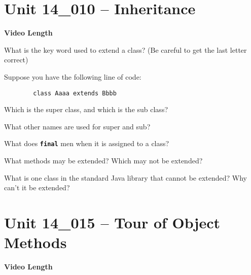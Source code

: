 \documentclass[letterpaper,12pt]{exam}
\newcommand{\unit}{Unit 14}
\begin{document}
\section*{\unit\_010 -- Inheritance} 
\par{\selectfont\textbf{Video Length }}
\begin{questions}

\begin{samepage}
    \question What is the key word used to extend a class?  (Be careful to get the last letter correct)
    \vspace{5mm}
\end{samepage}

\begin{samepage}
    \question Suppose you have the following line of code:
    \begin{verbatim}
        class Aaaa extends Bbbb
    \end{verbatim}
        Which is the super class, and which is the sub class?
    \vspace{5mm}
\end{samepage}
\begin{samepage}
    \question What other names are used for super and sub?
    \vspace{5mm}
\end{samepage}

\begin{samepage}
    \question What does \texttt{\textbf{final}} men when it is assigned to a class?
    \vspace{5mm}
\end{samepage}

\begin{samepage}
    \question What methods may be extended?  Which may not be extended?
    \vspace{5mm}
\end{samepage}

\begin{samepage}
    \question What is one class in the standard Java library that cannot be extended?  Why can't it be extended?
    \vspace{5mm}
\end{samepage}


\section*{\unit\_015 -- Tour of Object Methods } 
\par{\selectfont\textbf{Video Length }}


\end{questions}
\end{document}
